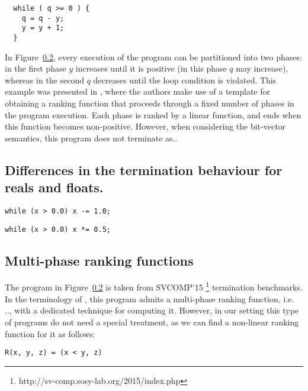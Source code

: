 \documentclass[preprint]{sigplanconf}
\theoremstyle{definition}
\begin{document}
\begin{lstlisting}
  while ( q >= 0 ) {
    q = q - y;
    y = y + 1;
  }
\end{lstlisting}

In Figure~\ref{}, every execution of the program can be partitioned into two phases: in the first phase $y$ increases
until it is positive (in this phase $q$ may increase), whereas in the second $q$ decreases until the loop condition is violated. 
This example was presented in \cite{DBLP:conf/tacas/LeikeH14}, where the authors make use of a template for obtaining a ranking function that proceeds
through a fixed number of phases in the program execution. Each phase is ranked by a linear function, and ends when this function becomes non-positive.
However, when considering the bit-vector semantics, this program does not terminate as..

\subsection{Differences in the termination behaviour for reals and floats.}
\begin{lstlisting}
while (x > 0.0) x -= 1.0;
\end{lstlisting}

\begin{lstlisting}
while (x > 0.0) x *= 0.5;
\end{lstlisting}


\subsection{Multi-phase ranking functions}
The program in Figure~\ref{} is taken from SVCOMP'15  \footnote{http://sv-comp.sosy-lab.org/2015/index.php} termination benchmarks.
In the terminology of \cite{DBLP:conf/tacas/LeikeH14}, this program admits a multi-phase ranking function, i.e. ..,  with a dedicated technique for computing it. However, in our setting 
this type of programs do not need a special treatment, as we can find a non-linear ranking function for it as follows:
\begin{verbatim}
R(x, y, z) = (x < y, z)
\end{verbatim}
\end{document}
